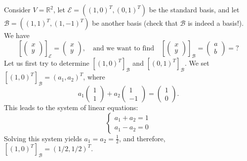 \begin{example}
\label{ex:coordinate_vector_calculation}
Consider $V = \mathbb{R}^2$, let $\mathcal{E} = \left((1, 0)^T, (0, 1)^T\right)$ be the standard basis, and let $\mathcal{B} = \left((1, 1)^T, (1, -1)^T\right)$ be another basis (check that $\mathcal{B}$ is indeed a basis!). We have
\[
\left[\begin{pmatrix} x \\ y \end{pmatrix}\right]_{\mathcal{E}} = \begin{pmatrix} x \\ y \end{pmatrix}, \quad \text{and we want to find} \quad \left[\begin{pmatrix} x \\ y \end{pmatrix}\right]_{\mathcal{B}} = \begin{pmatrix} a \\ b \end{pmatrix} = ?
\]
Let us first try to determine $[(1, 0)^T]_{\mathcal{B}}$ and $[(0, 1)^T]_{\mathcal{B}}$. We set $[(1, 0)^T]_{\mathcal{B}} = (a_1, a_2)^T$, where
\[
a_1 \begin{pmatrix} 1 \\ 1 \end{pmatrix} + a_2 \begin{pmatrix} 1 \\ -1 \end{pmatrix} = \begin{pmatrix} 1 \\ 0 \end{pmatrix}.
\]
This leads to the system of linear equations:
\[
\begin{cases}
a_1 + a_2 = 1 \\
a_1 - a_2 = 0
\end{cases}
\]
Solving this system yields $a_1 = a_2 = \frac{1}{2}$, and therefore, $[(1, 0)^T]_{\mathcal{B}} = (1/2, 1/2)^T$.


\end{example}
